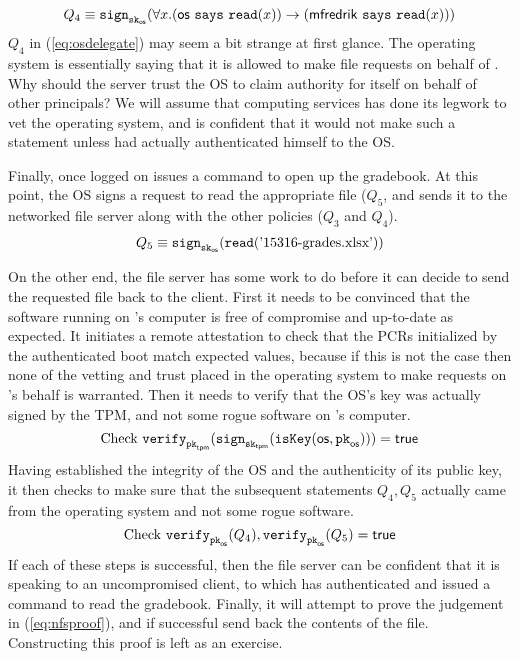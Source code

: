 \documentclass[11pt,twoside]{scrartcl}
\begin{document}
\begin{equation}
\label{eq:osdelegate}
Q_4 \equiv \sign{\sk{\os}}{\forall x . (\says{\os}{\readf{x}}) \limply (\says{\matt}{\readf{x}})}
\end{equation}
$Q_4$ in (\ref{eq:osdelegate}) may seem a bit strange at first glance. The operating system is essentially saying that it is allowed to make file requests on behalf of \matt. Why should the server trust the OS to claim authority for itself on behalf of other principals? We will assume that computing services has done its legwork to vet the operating system, and is confident that it would not make such a statement unless \matt had actually authenticated himself to the OS.

Finally, once logged on \matt issues a command to open up the gradebook. At this point, the OS signs a request to read the appropriate file ($Q_5$, and sends it to the networked file server along with the other policies ($Q_3$ and $Q_4$).
\begin{align}
Q_5 \equiv \texttt{\upshape sign}_{\texttt{\upshape sk}_{\mathsf{os}}}(\texttt{\upshape read}(\text{'15316-grades.xlsx'}))
\end{align}

On the other end, the file server has some work to do before it can decide to send the requested file back to the client. First it needs to be convinced that the software running on \matt's computer is free of compromise and up-to-date as expected. It initiates a remote attestation to check that the PCRs initialized by the authenticated boot match expected values, because if this is not the case then none of the vetting and trust placed in the operating system to make requests on \matt's behalf is warranted. Then it needs to verify that the OS's key was actually signed by the TPM, and not some rogue software on \matt's computer.
\begin{equation}
\text{Check}~\texttt{\upshape verify}_{\texttt{\upshape pk}_{\mathsf{tpm}}}(\texttt{\upshape sign}_{\texttt{\upshape sk}_{\mathsf{tpm}}}(\texttt{\upshape isKey}(\mathsf{os},\texttt{\upshape pk}_{\mathsf{os}}))) = \mathsf{true}
\end{equation}
Having established the integrity of the OS and the authenticity of its public key, it then checks to make sure that the subsequent statements $Q_4,Q_5$ actually came from the operating system and not some rogue software.
\begin{equation}
\text{Check}~\texttt{\upshape verify}_{\texttt{\upshape pk}_{\mathsf{os}}}(Q_4),\texttt{\upshape verify}_{\texttt{\upshape pk}_{\mathsf{os}}}(Q_5) = \mathsf{true}
\end{equation}
If each of these steps is successful, then the file server can be confident that it is speaking to an uncompromised client, to which \matt has authenticated and issued a command to read the gradebook. Finally, it will attempt to prove the judgement in (\ref{eq:nfsproof}), and if successful send back the contents of the file. Constructing this proof is left as an exercise.



\end{document}
